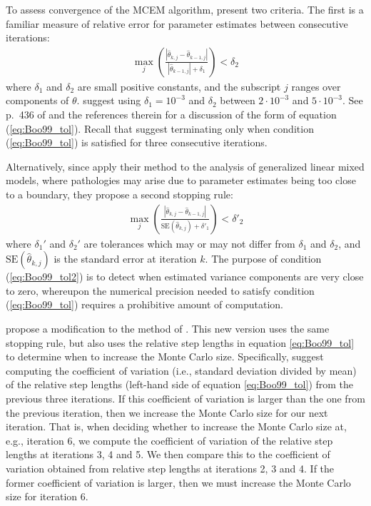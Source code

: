 \documentclass[11pt, oneside]{article}   	%
\begin{document}
To assess convergence of the MCEM algorithm, \citeauthor{Boo99} present two criteria. The first is a familiar measure of relative error for parameter estimates between consecutive iterations:
%
\begin{align}
    \max_j \left( \frac{\left| \hat{\theta}_{k, j} - \hat{\theta}_{k-1,j} \right|}{\left| \hat{\theta}_{k-1,j} \right| + \delta_1} \right) < \delta_2 \label{eq:Boo99_tol}
\end{align}
%
where $\delta_1$ and $\delta_2$ are small positive constants, and the subscript $j$ ranges over components of $\theta$. \citeauthor{Boo99} suggest using $\delta_1 = 10^{-3}$ and $\delta_2$ between $2 \cdot 10^{-3}$ and $5 \cdot 10^{-3}$. See p.\ 436 of \citet{Sea06} and the references therein for a discussion of the form of equation (\ref{eq:Boo99_tol}). Recall that \citeauthor{Boo99} suggest terminating only when condition (\ref{eq:Boo99_tol}) is satisfied for three consecutive iterations.

Alternatively, since \citeauthor{Boo99} apply their method to the analysis of generalized linear mixed models, where pathologies may arise due to parameter estimates being too close to a boundary, they propose a second stopping rule:
%
\begin{align}
    \max_j \left( \frac{\left| \hat{\theta}_{k, j} - \hat{\theta}_{k-1,j} \right|}{\mathrm{SE}\left(\hat{\theta}_{k,j}\right) + \delta'_1} \right) < \delta'_2 \label{eq:Boo99_tol2}
\end{align}
%
where $\delta_1'$ and $\delta_2'$ are tolerances which may or may not differ from $\delta_1$ and $\delta_2$, and $\mathrm{SE}\left(\hat{\theta}_{k,j}\right)$ is the standard error at iteration $k$. The purpose of condition (\ref{eq:Boo99_tol2}) is to detect when estimated variance components are very close to zero, whereupon the numerical precision needed to satisfy condition (\ref{eq:Boo99_tol}) requires a prohibitive amount of computation.

\citet{Rip02} propose a modification to the method of \citeauthor{Boo99}. This new version uses the same stopping rule, but also uses the relative step lengths in equation \ref{eq:Boo99_tol} to determine when to increase the Monte Carlo size. Specifically, \citeauthor{Rip02} suggest computing the coefficient of variation (i.e., standard deviation divided by mean) of the relative step lengths (left-hand side of equation \ref{eq:Boo99_tol}) from the previous three iterations. If this coefficient of variation is larger than the one from the previous iteration, then we increase the Monte Carlo size for our next iteration. That is, when deciding whether to increase the Monte Carlo size at, e.g., iteration 6, we compute the coefficient of variation of the relative step lengths at iterations 3, 4 and 5. We then compare this to the coefficient of variation obtained from relative step lengths at iterations 2, 3 and 4. If the former coefficient of variation is larger, then we must increase the Monte Carlo size for iteration 6.
\end{document}
